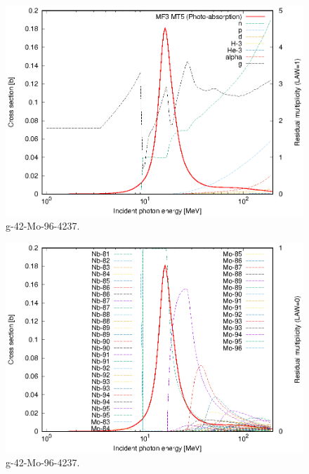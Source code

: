 \begin{figure}
 \includegraphics[width=\linewidth]{eps/g_42-Mo-96_4237.eps}
  \caption{g-42-Mo-96-4237.}
\end{figure}
\begin{figure}
 \includegraphics[width=\linewidth]{eps-law0/g_42-Mo-96_4237.eps}
 \caption{g-42-Mo-96-4237.}
\end{figure}
\newpage \clearpage

